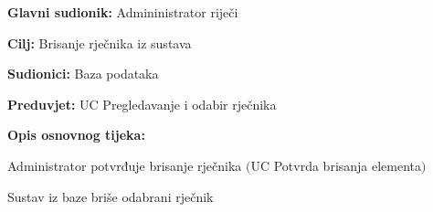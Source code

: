 					\noindent {}
					\begin{packed_item}
	
						\item \textbf{Glavni sudionik:} Admininistrator riječi
						\item  \textbf{Cilj:} Brisanje rječnika iz sustava
						\item  \textbf{Sudionici:} Baza podataka
						\item  \textbf{Preduvjet:} UC Pregledavanje i odabir rječnika
						\item  \textbf{Opis osnovnog tijeka:}
						
						\item[] \begin{packed_enum}
	
							\item Administrator potvrđuje brisanje rječnika $($UC Potvrda brisanja elementa$)$
							\item Sustav iz baze briše odabrani rječnik
						\end{packed_enum}
					
					\end{packed_item}

